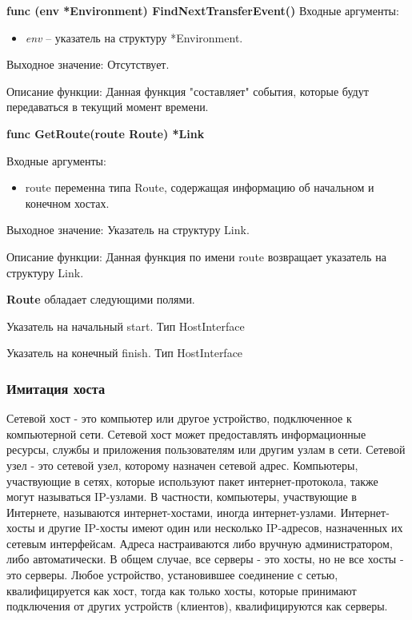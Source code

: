 \textbf{func (env *Environment) FindNextTransferEvent()}
Входные аргументы: 
\begin{itemize}
	\item \textit{env} -- указатель на структуру *Environment.
\end{itemize}

Выходное значение: Отсутствует. 

Описание функции: Данная функция "составляет" события, которые будут передаваться в текущий момент времени.  


\textbf{func GetRoute(route Route) *Link}

Входные аргументы: 
\begin{itemize}
	\item route переменна типа Route, содержащая информацию об начальном и конечном хостах.
\end{itemize}
Выходное значение: Указатель на структуру Link. 

Описание функции: Данная функция по имени route возвращает указатель на структуру Link.


\textbf{Route} обладает следующими полями.

Указатель на начальный	start. Тип  HostInterface

Указатель на конечный finish. Тип HostInterface

\subsubsection{Имитация хоста}

\par 
Сетевой хост - это компьютер или другое устройство, подключенное к компьютерной сети. Сетевой хост может предоставлять информационные ресурсы, службы и приложения пользователям или другим узлам в сети. Сетевой узел - это сетевой узел, которому назначен сетевой адрес.
Компьютеры, участвующие в сетях, которые используют пакет интернет-протокола, также могут называться IP-узлами. В частности, компьютеры, участвующие в Интернете, называются интернет-хостами, иногда интернет-узлами. Интернет-хосты и другие IP-хосты имеют один или несколько IP-адресов, назначенных их сетевым интерфейсам. Адреса настраиваются либо вручную администратором, либо автоматически. В общем случае, все серверы - это хосты, но не все хосты - это серверы. Любое устройство, установившее соединение с сетью, квалифицируется как хост, тогда как только хосты, которые принимают подключения от других устройств (клиентов), квалифицируются как серверы.

